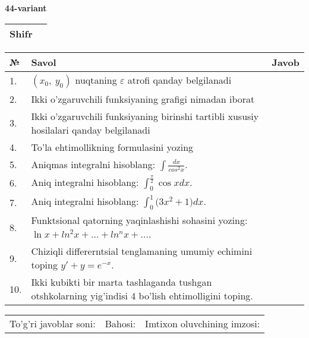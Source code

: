 \documentclass{article}
\begin{document}
  \egroup
  
  \newpage
  
  
  \textbf{44-variant}\\
  
  \bgroup
  \def\arraystretch{1.6} %
  
  \begin{tabular}{|m{5.7cm}|m{9.5cm}|}
  \hline
  Shifr & \\
  \hline
  \end{tabular}
  
  \vspace{1cm}
  
  \begin{tabular}{|m{0.7cm}|m{10cm}|m{4cm}|}
  \hline
  № & Savol & Javob \\
  \hline
  1. & \((x_{0},\ y_{0})\) nuqtaning \(\varepsilon\) atrofi qanday belgilanadi &  \\
  \hline
  2. & Ikki o'zgaruvchili funksiyaning grafigi nimadan iborat &  \\
  \hline
  3. & Ikki o'zgaruvchili funksiyaning birinshi tartibli xususiy hosilalari qanday belgilanadi &  \\
  \hline
  4. & To'la ehtimollikning formulasini yozing &  \\
  \hline
  5. & Aniqmas integralni hisoblang: \(\int \frac{dx}{cos^{2}x}\). &  \\
  \hline
  6. & Aniq integralni hisoblang: \(\int_{0}^{\frac{\pi}{2}}{\cos xdx}\). &  \\
  \hline
  7. & Aniq integralni hisoblang: \(\int_{0}^{1}{(3x^{2}} + 1)dx\). &  \\
  \hline
  8. & Funktsional qatorning yaqinlashishi sohasini yozing: \(\ln x + ln^{2}x + ... + ln^{n}x + ...\). &  \\
  \hline
  9. & Chiziqli differerntsial tenglamaning umumiy echimini toping \(y' + y = e^{- x}\). &  \\
  \hline
  10. & Ikki kubikti bir marta tashlaganda tushgan otshkolarning yig'indisi 4 bo'lish ehtimolligini toping. &  \\
  \hline
  \end{tabular}
  
  \vspace{1cm}
  
  \begin{tabular}{lll}
  To'g'ri javoblar soni: \underline{\hspace{1.5cm}} & 
  Bahosi: \underline{\hspace{1.5cm}} & 
  Imtixon oluvchining imzosi: \underline{\hspace{2cm}} \\
  \end{tabular}
  
\end{document}
